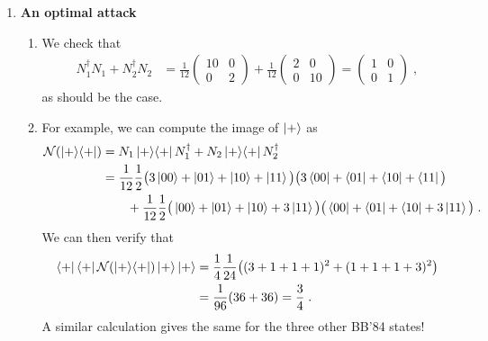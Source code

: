 \documentclass[12pt]{article}
\begin{document}
\begin{enumerate}
		
\item {\bf An optimal attack}\label{ex:opt-wiesner}
 
\begin{enumerate}
\item We check that 
\begin{align*}
N_1^\dagger N_1 + N_2^\dagger N_2  &= \frac{1}{12}\begin{pmatrix} 10 & 0 \\ 0 & 2 \end{pmatrix}+\frac{1}{12} \begin{pmatrix} 2 & 0 \\ 0 & 10 \end{pmatrix} = \begin{pmatrix} 1 & 0 \\ 0 & 1\end{pmatrix}\;,
\end{align*}
as should be the case. 
\item For example, we can compute the image of $\ket{+}$ as 
\begin{align*} 
\mathcal{N}(\ket{+}\!\bra{+}) &= N_1 \ket{+}\!\bra{+} N_1^\dagger + N_2 \ket{+}\!\bra{+}N_2^\dagger \\
&= \frac{1}{12} \frac{1}{2}\big( 3\ket{00} + \ket{01} + \ket{10} + \ket{11} \big)\big( 3\bra{00} + \bra{01} + \bra{10} + \bra{11} \big)\\
&\qquad +\frac{1}{12} \frac{1}{2}\big( \ket{00} + \ket{01} + \ket{10} + 3\ket{11} \big)\big( \bra{00} + \bra{01} + \bra{10} + 3\ket{11} \big)\;.
\end{align*}
We can then verify that 
\begin{align*}
\bra{+}\bra{+}\mathcal{N}(\ket{+}\!\bra{+})\ket{+}\ket{+} &= \frac{1}{4}\frac{1}{24}\big( (3+1+1+1)^2 + (1+1+1+3)^2 \big)\\
&= \frac{1}{96}( 36+36) = \frac{3}{4}\;.
\end{align*}
A similar calculation gives the same for the three other BB'84 states!
\end{enumerate}

\end{enumerate}
\end{document}

